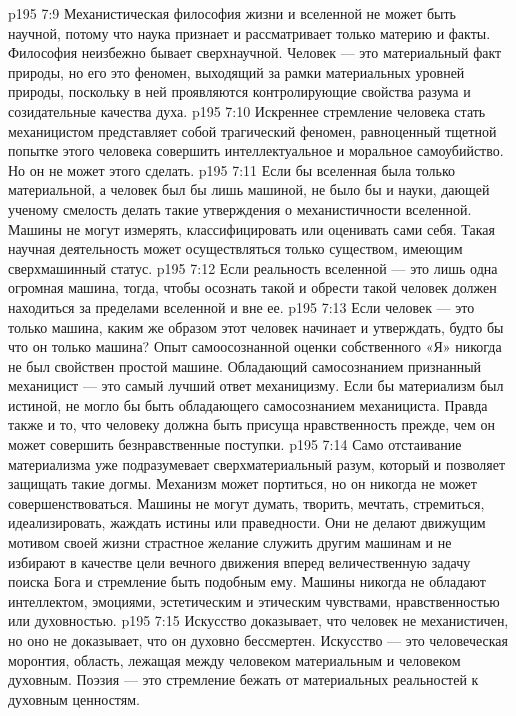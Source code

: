 \vs p195 7:9 Механистическая философия жизни и вселенной не может быть научной, потому что наука признает и рассматривает только материю и факты. Философия неизбежно бывает сверхнаучной. Человек --- это материальный факт природы, но его  это феномен, выходящий за рамки материальных уровней природы, поскольку в ней проявляются контролирующие свойства разума и созидательные качества духа.
\vs p195 7:10 Искреннее стремление человека стать механицистом представляет собой трагический феномен, равноценный тщетной попытке этого человека совершить интеллектуальное и моральное самоубийство. Но он не может этого сделать.
\vs p195 7:11 Если бы вселенная была только материальной, а человек был бы лишь машиной, не было бы и науки, дающей ученому смелость делать такие утверждения о механистичности вселенной. Машины не могут измерять, классифицировать или оценивать сами себя. Такая научная деятельность может осуществляться только существом, имеющим сверхмашинный статус.
\vs p195 7:12 Если реальность вселенной --- это лишь одна огромная машина, тогда, чтобы осознать такой  и обрести  такой  человек должен находиться за пределами вселенной и вне ее.
\vs p195 7:13 \pc Если человек --- это только машина, каким же образом этот человек начинает  и утверждать, будто бы  что он только машина? Опыт самоосознанной оценки собственного «Я» никогда не был свойствен простой машине. Обладающий самосознанием признанный механицист --- это самый лучший ответ механицизму. Если бы материализм был истиной, не могло бы быть обладающего самосознанием механициста. Правда также и то, что человеку должна быть присуща нравственность прежде, чем он может совершить безнравственные поступки.
\vs p195 7:14 \pc Само отстаивание материализма уже подразумевает сверхматериальный разум, который и позволяет защищать такие догмы. Механизм может портиться, но он никогда не может совершенствоваться. Машины не могут думать, творить, мечтать, стремиться, идеализировать, жаждать истины или праведности. Они не делают движущим мотивом своей жизни страстное желание служить другим машинам и не избирают в качестве цели вечного движения вперед величественную задачу поиска Бога и стремление быть подобным ему. Машины никогда не обладают интеллектом, эмоциями, эстетическим и этическим чувствами, нравственностью или духовностью.
\vs p195 7:15 Искусство доказывает, что человек не механистичен, но оно не доказывает, что он духовно бессмертен. Искусство --- это человеческая моронтия, область, лежащая между человеком материальным и человеком духовным. Поэзия --- это стремление бежать от материальных реальностей к духовным ценностям.
